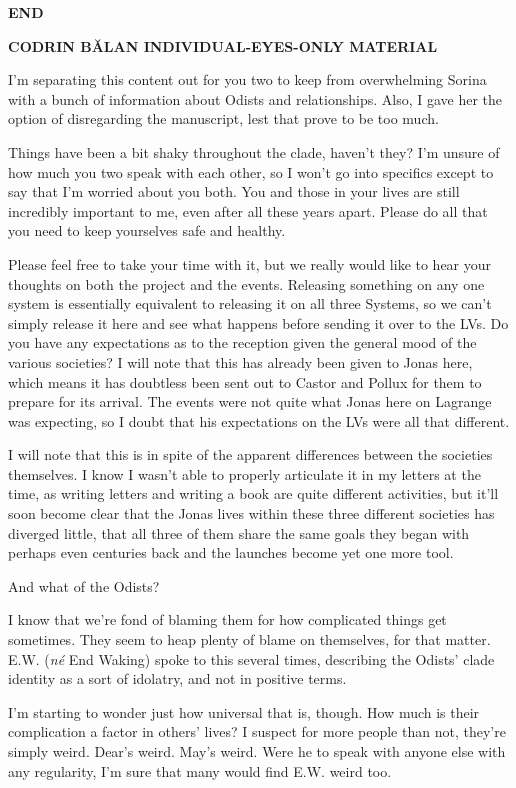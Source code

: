 \textbf{END}

\textbf{CODRIN BĂLAN INDIVIDUAL-EYES-ONLY MATERIAL}

I'm separating this content out for you two to keep from overwhelming Sorina with a bunch of information about Odists and relationships. Also, I gave her the option of disregarding the manuscript, lest that prove to be too much.

Things have been a bit shaky throughout the clade, haven't they? I'm unsure of how much you two speak with each other, so I won't go into specifics except to say that I'm worried about you both. You and those in your lives are still incredibly important to me, even after all these years apart. Please do all that you need to keep yourselves safe and healthy.

Please feel free to take your time with it, but we really would like to hear your thoughts on both the project and the events. Releasing something on any one system is essentially equivalent to releasing it on all three Systems, so we can't simply release it here and see what happens before sending it over to the LVs. Do you have any expectations as to the reception given the general mood of the various societies? I will note that this has already been given to Jonas here, which means it has doubtless been sent out to Castor and Pollux for them to prepare for its arrival. The events were not quite what Jonas here on Lagrange was expecting, so I doubt that his expectations on the LVs were all that different.

I will note that this is in spite of the apparent differences between the societies themselves. I know I wasn't able to properly articulate it in my letters at the time, as writing letters and writing a book are quite different activities, but it'll soon become clear that the Jonas lives within these three different societies has diverged little, that all three of them share the same goals they began with perhaps even centuries back and the launches become yet one more tool.

And what of the Odists?

I know that we're fond of blaming them for how complicated things get sometimes. They seem to heap plenty of blame on themselves, for that matter. E.W. (\emph{né} End Waking) spoke to this several times, describing the Odists' clade identity as a sort of idolatry, and not in positive terms.

I'm starting to wonder just how universal that is, though. How much is their complication a factor in others' lives? I suspect for more people than not, they're simply weird. Dear's weird. May's weird. Were he to speak with anyone else with any regularity, I'm sure that many would find E.W. weird too.

